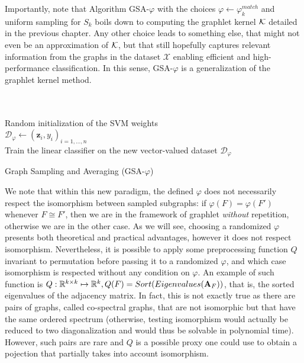 Importantly, note that Algorithm GSA-$\varphi$ with the choices $\varphi\leftarrow\varphi^{match}_k$ and uniform sampling for $S_k$ boils down to computing the graphlet kernel $\mathcal{K}$ detailed in the previous chapter. Any other choice leads to something else, that might not even be an approximation of $\mathcal{K}$, but that still hopefully captures relevant information from the graphs in the dataset $\mathcal{X}$ enabling efficient and high-performance classification. In this sense, GSA-$\varphi$ is a generalization of the graphlet kernel method. 

\begin{algorithm}[t]
	\label{alg:GSA}
\DontPrintSemicolon
  \\
  \\
  \Algo{\\}
  Random initialization of the SVM weights\\
  $\mathcal{D}_{\varphi}\gets (\mathbf{z}_i,y_i)_{i=1,\ldots, n}$\\
  Train the linear classifier on the new vector-valued dataset $\mathcal{D}_{\varphi}$
\caption{Graph Sampling and Averaging (GSA-$\varphi$)}
\end{algorithm}

We note that within this new paradigm, the defined $\varphi$ does not necessarily respect the isomorphism between sampled subgraphs: if $\varphi(F) = \varphi(F')$ whenever $F \cong F'$, then we are in the framework of graphlet \emph{without} repetition, otherwise we are in the other case. As we will see, choosing a randomized $\varphi$ presents both theoretical and practical advantages, however it does not respect isomorphism. Nevertheless, it is possible to apply some preprocessing function $Q$ invariant to permutation before passing it to a randomized $\varphi$, and which case isomorphism is respected without any condition on $\varphi$. An example of such function is $Q:\mathbb{R}^{k\times k}\mapsto \mathbb{R}^k, Q(F)=Sort(Eigenvalues(\mathbf{A}_F))$, that is, the sorted eigenvalues of the adjacency matrix. In fact, this is not exactly true as there are pairs of graphs, called co-spectral graphs, that are not isomorphic but that have the same ordered spectrum (otherwise, testing isomorphism would actually be reduced to two diagonalization and would thus be solvable in polynomial time). However, such pairs are rare and $Q$ is a possible proxy one could use to obtain a pojection that partially takes into account isomorphism.

